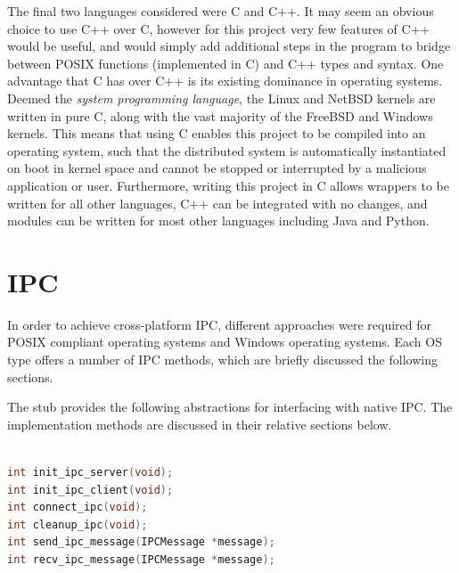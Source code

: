 \documentclass[a4paper, 11pt]{report}
\begin{document}
The final two languages considered were C\cite{c} and C++\cite{cpp}. It may seem an obvious choice to use C++ over C, however for this project very few features of C++ would be useful, and would simply add additional steps in the program to bridge between \acrfull{POSIX} functions (implemented in C) and C++ types and syntax. One advantage that C has over C++ is its existing dominance in operating systems. Deemed the \textit{system programming language}, the Linux\cite{linux} and NetBSD\cite{netbsd} kernels are written in pure C, along with the vast majority of the FreeBSD\cite{freebsd} and Windows\cite{windows} kernels. This means that using C enables this project to be compiled into an operating system, such that the distributed system is automatically instantiated on boot in kernel space and cannot be stopped or interrupted by a malicious application or user. Furthermore, writing this project in C allows wrappers to be written for all other languages, C++ can be integrated with no changes, and modules can be written for most other languages including Java and Python.

\section{IPC}
In order to achieve cross-platform \acrshort{IPC}, different approaches were required for \acrfull{POSIX} compliant operating systems and Windows\cite{windows} operating systems. Each \acrshort{OS} type offers a number of \acrshort{IPC} methods, which are briefly discussed the following sections.

The \gls{stub} provides the following abstractions for interfacing with native \acrshort{IPC}. The implementation methods are discussed in their relative sections below.\\\\

\begin{lstlisting}[language=c,style=c,caption=IPC API]
int init_ipc_server(void);
int init_ipc_client(void);
int connect_ipc(void);
int cleanup_ipc(void);
int send_ipc_message(IPCMessage *message);
int recv_ipc_message(IPCMessage *message);
\end{lstlisting}
\end{document}
